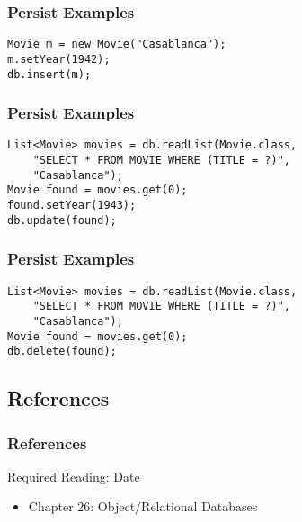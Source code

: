 \documentclass[dvipsnames]{beamer}
\theoremstyle{plain}
\begin{document}
\begin{frame}[fragile]
  \frametitle{Persist Examples}

  \begin{example}[insert]
    \begin{lstlisting}
Movie m = new Movie("Casablanca");
m.setYear(1942);
db.insert(m);
    \end{lstlisting}
  \end{example}
\end{frame}

\begin{frame}[fragile]
  \frametitle{Persist Examples}

  \begin{example}[update]
    \begin{lstlisting}
List<Movie> movies = db.readList(Movie.class,
    "SELECT * FROM MOVIE WHERE (TITLE = ?)",
    "Casablanca");
Movie found = movies.get(0);
found.setYear(1943);
db.update(found);
    \end{lstlisting}
  \end{example}
\end{frame}

\begin{frame}[fragile]
  \frametitle{Persist Examples}

  \begin{example}[delete]
    \begin{lstlisting}
List<Movie> movies = db.readList(Movie.class,
    "SELECT * FROM MOVIE WHERE (TITLE = ?)",
    "Casablanca");
Movie found = movies.get(0);
db.delete(found);
    \end{lstlisting}
  \end{example}
\end{frame}

\subsection*{References}

\begin{frame}
  \frametitle{References}

  \begin{block}{Required Reading: Date}
    \begin{itemize}
      \item Chapter 26: \alert{Object/Relational Databases}
    \end{itemize}
  \end{block}
\end{frame}
\end{document}
